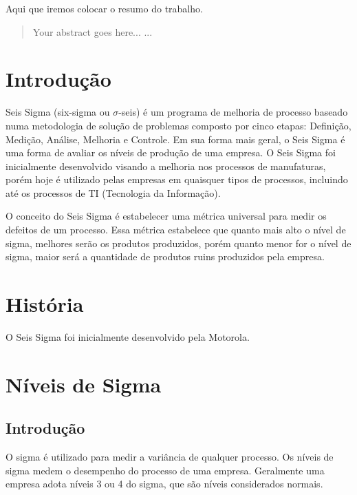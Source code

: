 \documentclass{abnt}
\begin{document}
	\capa
	
	\folhaderosto
	
	\begin{resumo}
		Aqui que iremos colocar o resumo do trabalho.
	\end{resumo}

	\begin{abstract}
		Your abstract goes here...
		...
	\end{abstract}
	
	\sumario
	
	\chapter {Introdução}
	
	Seis Sigma (six-sigma ou $\sigma$-seis) é um programa de melhoria de processo baseado numa 
	metodologia de solução de problemas composto por cinco etapas: Definição, Medição, Análise, 
	Melhoria e Controle. Em sua forma mais geral, o Seis Sigma é uma forma de avaliar os níveis 
	de produção de uma empresa. O Seis Sigma foi inicialmente desenvolvido visando a melhoria nos 
	processos de manufaturas, porém hoje é utilizado pelas empresas em quaisquer tipos de processos, 
	incluindo até os processos de TI (Tecnologia da Informação).
	
	O conceito do Seis Sigma é estabelecer uma métrica universal para medir os defeitos de um processo. 
	Essa métrica estabelece que quanto mais alto o nível de sigma, melhores serão os produtos produzidos, 
	porém quanto menor for o nível de sigma, maior será a quantidade de produtos ruins produzidos pela empresa.
	
	\chapter {História}
	
	O Seis Sigma foi inicialmente desenvolvido pela Motorola.
	
	\chapter {Níveis de Sigma}
		\section {Introdução}
			O sigma é utilizado para medir a variância de qualquer processo. Os níveis de sigma medem o desempenho do processo de uma empresa.
			Geralmente uma empresa adota níveis 3 ou 4 do sigma, que são níveis considerados normais.
			
\end{document}
